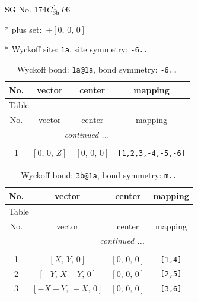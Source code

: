 \documentclass[fleqn,8pt]{jsarticle}
\begin{document}
\setcounter{MaxMatrixCols}{32}

\renewcommand{\tablename}{Table~}
\renewcommand{\figurename}{Figure~}
\begin{center}
\LARGE
SG No. 174\quad$C_{\rm 3h}^{1}$\quad$P\bar{6}$\quad[ hexagonal ]
\end{center}

* plus set:\,\,\,$+\left[ 0,\, 0,\, 0 \right]$


* Wyckoff site: {\tt 1a}, site symmetry: {\tt -6..}
\renewcommand{\arraystretch}{1.2}
\begin{longtable}{cccc}
\caption{Wyckoff bond: {\tt 1a@1a}, bond symmetry: {\tt -6..}}
 \\
 \hline \hline
No. & vector & center & mapping \\ \hline \endfirsthead

\multicolumn{3}{l}{\tablename\ \thetable{}} \\
 \hline \hline
No. & vector & center & mapping \\ \hline \endhead

 \hline \hline
\multicolumn{3}{r}{\footnotesize\it continued ...} \\ \endfoot

 \hline \hline
\multicolumn{3}{r}{} \\ \endlastfoot

1 & $\left[ 0,\, 0,\, Z \right]$ & $\left[ 0,\, 0,\, 0 \right]$ & {\tt [1,2,3,-4,-5,-6]} \\
\end{longtable}
\renewcommand{\arraystretch}{1.2}
\begin{longtable}{cccc}
\caption{Wyckoff bond: {\tt 3b@1a}, bond symmetry: {\tt m..}}
 \\
 \hline \hline
No. & vector & center & mapping \\ \hline \endfirsthead

\multicolumn{3}{l}{\tablename\ \thetable{}} \\
 \hline \hline
No. & vector & center & mapping \\ \hline \endhead

 \hline \hline
\multicolumn{3}{r}{\footnotesize\it continued ...} \\ \endfoot

 \hline \hline
\multicolumn{3}{r}{} \\ \endlastfoot

1 & $\left[ X,\, Y,\, 0 \right]$ & $\left[ 0,\, 0,\, 0 \right]$ & {\tt [1,4]} \\ \hline
2 & $\left[ - Y,\, X - Y,\, 0 \right]$ & $\left[ 0,\, 0,\, 0 \right]$ & {\tt [2,5]} \\ \hline
3 & $\left[ - X + Y,\, - X,\, 0 \right]$ & $\left[ 0,\, 0,\, 0 \right]$ & {\tt [3,6]} \\
\end{longtable}
\end{document}
